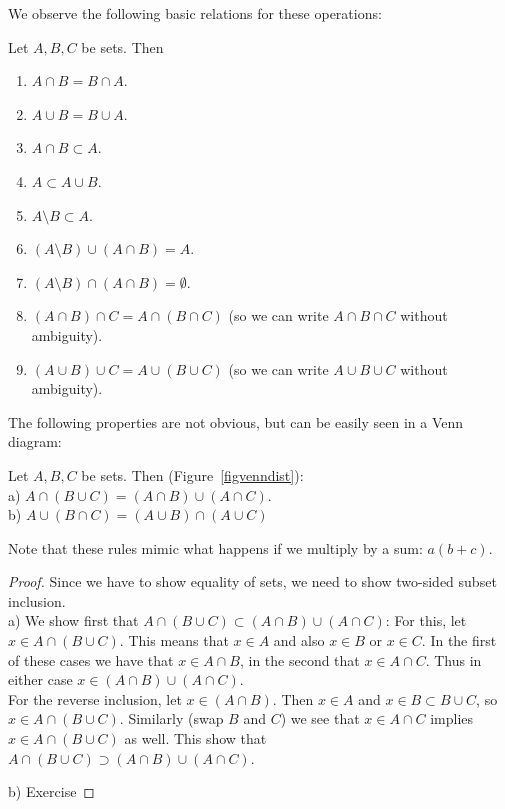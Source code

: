 We observe the following basic relations for these operations:
\begin{lemma}
Let $A,B,C$ be sets. Then
\begin{enumerate}
\item $A\cap B=B\cap A$.
\item $A\cup B=B\cup A$.
\item $A\cap B\subset A$.
\item $A\subset A\cup B$.
\item $A\setminus B\subset A$.
\item $(A\setminus B)\cup (A\cap B)=A$.
\item $(A\setminus B)\cap (A\cap B)=\emptyset$.
\item $(A\cap B)\cap C=A\cap (B\cap C)$ (so we can write $A\cap B\cap C$
without ambiguity).
\item $(A\cup B)\cup C=A\cup (B\cup C)$ (so we can write $A\cup B\cup C$
without ambiguity).
\end{enumerate}
\end{lemma}

The following properties are not obvious, but can be easily seen in a Venn
diagram:
\begin{thm}
Let $A,B,C$ be sets. Then (Figure~\ref{figvenndist}):\\
a) $A\cap (B\cup C)=(A\cap B)\cup(A\cap C)$.\\
b) $A\cup (B\cap C)=(A\cup B)\cap(A\cup C)$
\end{thm}
Note that these rules mimic what happens if we multiply by a sum: $a(b+c)$.
\begin{proof}
Since we have to show equality of sets, we need to show two-sided subset
inclusion.\\
a) We show first that $A\cap (B\cup C)\subset (A\cap B)\cup(A\cap C)$: For this,
let $x\in A\cap (B\cup C)$. This means that $x\in A$ and also $x\in B$ or
$x\in C$. In the first of these cases we have that $x\in A\cap B$, in the
second that $x\in A\cap C$. Thus in either case $x\in (A\cap B)\cup (A\cap
C)$. \\
For the reverse inclusion,
let $x\in (A\cap B)$. Then $x\in A$ and $x\in B\subset B\cup C$, so $x\in
A\cap (B\cup C)$. Similarly (swap $B$ and $C$) we see that $x\in A\cap C$
implies $x\in A\cap (B\cup C)$ as well. This show that
$A\cap (B\cup C)\supset (A\cap B)\cup(A\cap C)$.

b) Exercise
\end{proof}

